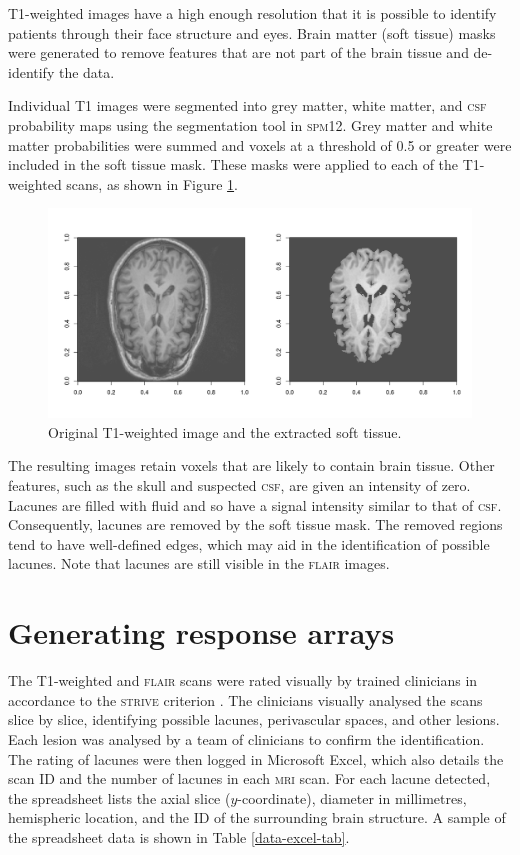 T1-weighted images have a high enough resolution that it is possible to identify patients through their face structure and eyes. Brain matter (soft tissue) masks were generated to remove features that are not part of the brain tissue and de-identify the data.

Individual T1 images were segmented into grey matter, white matter, and \textsc{csf} probability maps using the segmentation tool in \textsc{spm12}. Grey matter and white matter probabilities were summed and voxels at a threshold of 0.5 or greater were included in the soft tissue mask. These masks were applied to each of the T1-weighted scans, as shown in Figure \ref{data-t1-soft-fig}.

\begin{figure}[ht]
\centering
\includegraphics[width=\linewidth]{Images/6_t1_soft_eg.png}
\caption{Original T1-weighted image and the extracted soft tissue.}
\label{data-t1-soft-fig}
\end{figure}

The resulting images retain voxels that are likely to contain brain tissue. Other features, such as the skull and suspected \textsc{csf}, are given an intensity of zero. Lacunes are filled with fluid and so have a signal intensity similar to that of \textsc{csf}. Consequently, lacunes are removed by the soft tissue mask. The removed regions tend to have well-defined edges, which may aid in the identification of possible lacunes. Note that lacunes are still visible in the \textsc{flair} images.

\section{Generating response arrays}\label{data-lacune}

The T1-weighted and \textsc{flair} scans were rated visually by trained clinicians in accordance to the \textsc{strive} criterion \cite{WardlawJ.M.2013Nsfr}. The clinicians visually analysed the scans slice by slice, identifying possible lacunes, perivascular spaces, and other lesions. Each lesion was analysed by a team of clinicians to confirm the identification. The rating of lacunes were then logged in Microsoft Excel, which also details the scan ID and the number of lacunes in each \textsc{mri} scan. For each lacune detected, the spreadsheet lists the axial slice ($y$-coordinate), diameter in millimetres, hemispheric location, and the ID of the surrounding brain structure. A sample of the spreadsheet data is shown in Table \ref{data-excel-tab}.

